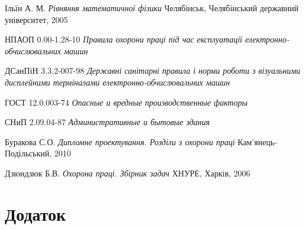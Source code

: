 \documentclass[a4paper,12pt]{article}
\begin{document}
\begin{thebibliography}{9}
	Ільїн А. М.
	\emph{Рівняння математичної фізики}
	Челябінськ, Челябінський державний університет, 2005
	
	НПАОП 0.00-1.28-10
	\emph{Правила охорони праці під час експлуатації електронно-обчислювальних машин}
	
	ДСанПіН  3.3.2-007-98
	\emph{Державні санітарні правила і норми роботи з візуальними дисплейними терміналами електронно-обчислювальних машин}
	
	ГОСТ 12.0.003-74
	\emph{Опасные и вредные производственные факторы}
	
	СНиП 2.09.04-87
	\emph{Административные и бытовые здания}
	
	Буракова С.О.
	\emph{Дипломне проектування. Розділи з охорони праці}
	Кам’янець-Подільський, 2010
	
	Дзюндзюк Б.В.
	\emph{Охорона праці. Збірник задач}
	ХНУРЕ, Харків, 2006

\end{thebibliography}

\newpage
{}
\section*{Додаток}


\lstset{
	basicstyle=\scriptsize,
	tabsize=2,
	breaklines=true,
	title=\lstname,
	showspaces=false,
	showstringspaces=false,
	showtabs=false
} 















\end{document}
